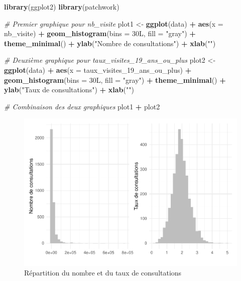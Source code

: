 \documentclass[
]{article}
\newenvironment{Shaded}{\begin{snugshade}}{\end{snugshade}}
\newcommand{\AttributeTok}[1]{\textcolor[rgb]{0.13,0.29,0.53}{#1}}
\newcommand{\CommentTok}[1]{\textcolor[rgb]{0.56,0.35,0.01}{\textit{#1}}}
\newcommand{\DataTypeTok}[1]{\textcolor[rgb]{0.13,0.29,0.53}{#1}}
\newcommand{\DecValTok}[1]{\textcolor[rgb]{0.00,0.00,0.81}{#1}}
\newcommand{\FunctionTok}[1]{\textcolor[rgb]{0.13,0.29,0.53}{\textbf{#1}}}
\newcommand{\NormalTok}[1]{#1}
\newcommand{\OtherTok}[1]{\textcolor[rgb]{0.56,0.35,0.01}{#1}}
\newcommand{\SpecialCharTok}[1]{\textcolor[rgb]{0.81,0.36,0.00}{\textbf{#1}}}
\newcommand{\StringTok}[1]{\textcolor[rgb]{0.31,0.60,0.02}{#1}}
\begin{document}
\begin{Shaded}
\begin{Highlighting}[]
\FunctionTok{library}\NormalTok{(ggplot2)}
\FunctionTok{library}\NormalTok{(patchwork)}

\CommentTok{\# Premier graphique pour nb\_visite}
\NormalTok{plot1 }\OtherTok{\textless{}{-}} \FunctionTok{ggplot}\NormalTok{(data) }\SpecialCharTok{+}
  \FunctionTok{aes}\NormalTok{(}\AttributeTok{x =}\NormalTok{ nb\_visite) }\SpecialCharTok{+}
  \FunctionTok{geom\_histogram}\NormalTok{(}\AttributeTok{bins =} \DecValTok{30}\DataTypeTok{L}\NormalTok{, }\AttributeTok{fill =} \StringTok{"gray"}\NormalTok{) }\SpecialCharTok{+}
  \FunctionTok{theme\_minimal}\NormalTok{() }\SpecialCharTok{+}
  \FunctionTok{ylab}\NormalTok{(}\StringTok{"Nombre de consultations"}\NormalTok{) }\SpecialCharTok{+}
  \FunctionTok{xlab}\NormalTok{(}\StringTok{""}\NormalTok{)}

\CommentTok{\# Deuxième graphique pour taux\_visites\_19\_ans\_ou\_plus}
\NormalTok{plot2 }\OtherTok{\textless{}{-}} \FunctionTok{ggplot}\NormalTok{(data) }\SpecialCharTok{+}
  \FunctionTok{aes}\NormalTok{(}\AttributeTok{x =}\NormalTok{ taux\_visites\_19\_ans\_ou\_plus) }\SpecialCharTok{+}
  \FunctionTok{geom\_histogram}\NormalTok{(}\AttributeTok{bins =} \DecValTok{30}\DataTypeTok{L}\NormalTok{, }\AttributeTok{fill =} \StringTok{"gray"}\NormalTok{) }\SpecialCharTok{+}
  \FunctionTok{theme\_minimal}\NormalTok{() }\SpecialCharTok{+}
  \FunctionTok{ylab}\NormalTok{(}\StringTok{"Taux de consultations"}\NormalTok{) }\SpecialCharTok{+}
  \FunctionTok{xlab}\NormalTok{(}\StringTok{""}\NormalTok{)}

\CommentTok{\# Combinaison des deux graphiques}
\NormalTok{plot1 }\SpecialCharTok{+}\NormalTok{ plot2}
\end{Highlighting}
\end{Shaded}

\begin{figure}

{\centering \includegraphics{4_Analyse_Descriptive_files/figure-latex/unnamed-chunk-7-1} 

}

\caption{Répartition du nombre et du taux de consultations}\label{fig:unnamed-chunk-7}
\end{figure}
\end{document}

